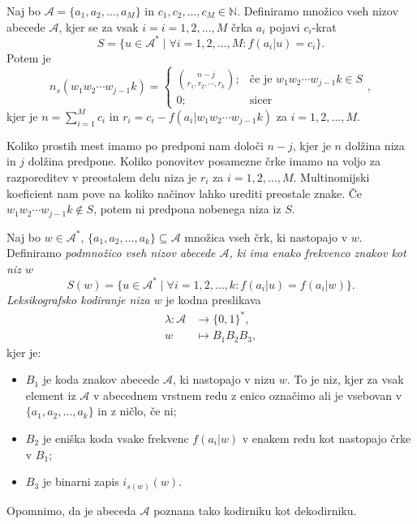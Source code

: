 \documentclass[fin1, tisk]{fmfdelo}
\newcommand{\N}{\mathbb{N}}
\newcommand{\A}{\mathcal{A}}
\theoremstyle{definition}
\begin{document}
\begin{trditev}
    Naj bo $\A = \{a_1, a_2, \ldots, a_M \}$ in $c_1, c_2, \ldots, c_M \in \N$.
    Definiramo množico vseh nizov abecede $\A$, kjer se za vsak $i= i = 1, 2, \ldots, M$ črka
    $a_i$ pojavi $c_i$-krat
    \[
        S = \bigl\{ u \in \A^* \mid \forall i= 1, 2, \ldots, M \colon f(a_i|u) = c_i \bigr\}.
    \]
    Potem je
    \[
        n_s(w_1w_2 \cdots w_{j-1}k) = 
        \begin{cases}
            \binom{n-j}{r_1, r_2, \cdots, r_k}; & \text{če je } w_1w_2 \cdots w_{j-1}k \in S\\
            0; & \text{sicer}
        \end{cases},
    \]
    kjer je $n = \sum_{i=1}^M c_i$ in $r_i = c_i - f(a_i|w_1w_2 \cdots w_{j-1}k)$ za 
    $i = 1, 2, \ldots, M$.
\end{trditev}

\begin{dokaz}
    Koliko prostih mest imamo po predponi nam določi $n-j$, kjer je $n$ dolžina niza
    in $j$ dolžina predpone. Koliko ponovitev posamezne črke imamo na voljo za razporeditev v
    preostalem delu niza je $r_i$ za $i=1,2, \ldots, M$. Multinomijski koeficient nam pove na koliko
    načinov lahko urediti preostale znake. Če $w_1w_2 \cdots w_{j-1}k \notin S$, potem ni predpona
    nobenega niza iz $S$.
\end{dokaz}

\begin{definicija}\label{def:LeksikografskoKodiranje}
    Naj bo $w \in \A^*$, $\{a_1, a_2, \ldots, a_k \} \subseteq \A$ množica vseh črk, ki 
    nastopajo v $w$. Definiramo \emph{podmnožico vseh nizov abecede $\A$, ki ima enako
    frekvenco znakov kot niz $w$}
    \[
        S(w) = \bigl\{ u \in \A^* \mid \forall i= 1, 2, \ldots, k \colon f(a_i|u) = f(a_i|w) \bigr\}.
    \]
    \emph{Leksikografsko kodiranje niza $w$} je kodna preslikava
    \begin{align*}
        \lambda  \colon \A &\to \{ 0, 1\}^*, \\
        w &\mapsto B_1B_2B_3,
    \end{align*}
    kjer je:
    \begin{itemize}
        \item $B_1$ je koda znakov abecede $\A$, ki nastopajo v nizu $w$. To je niz, kjer
        za vsak element iz $\A$ v abecednem vrstnem redu z enico označimo ali je vsebovan
        v $\{a_1, a_2, \ldots, a_k \}$ in z ničlo, če ni;
        \item $B_2$ je eniška koda vsake frekvenc $f(a_i|w)$ v enakem redu kot nastopajo črke v $B_1$;
        \item $B_3$ je binarni zapis $i_{s(w)}(w)$.
    \end{itemize}
    Opomnimo, da je abeceda $\A$ poznana tako kodirniku kot dekodirniku.
\end{definicija}
\end{document}
